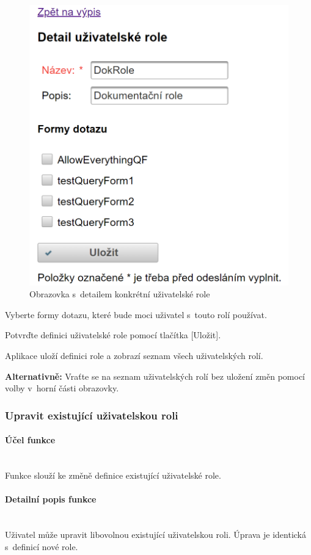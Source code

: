 \documentclass[thesis=M,czech]{FITthesis}[2019/12/23]
\newcommand{\lbparagraph}[1]{\paragraph{#1}\mbox{}\\} %
\begin{document}
\begin{figure}[H]
  \centering
  \includegraphics[scale=0.60]{res/guide/UserRoleDetail.png}
  \caption{Obrazovka s~detailem konkrétní uživatelské role}
  \label{fig:Obrazovka s~detailem konkrétní uživatelské role}
\end{figure}

Vyberte formy dotazu, které bude moci uživatel s~touto rolí používat.

Potvrďte definici uživatelské role pomocí tlačítka [Uložit].

Aplikace uloží definici role a zobrazí seznam všech uživatelských rolí.

\textbf{Alternativně:} Vraťte se na seznam uživatelských rolí bez uložení změn pomocí volby  v~horní části obrazovky.

\newpage
\subsubsection{Upravit existující uživatelskou roli}
\lbparagraph{Účel funkce}
Funkce slouží ke změně definice existující uživatelské role.

\lbparagraph{Detailní popis funkce}
Uživatel může upravit libovolnou existující uživatelskou roli. Úprava je identická s~definicí nové role.
\end{document}
